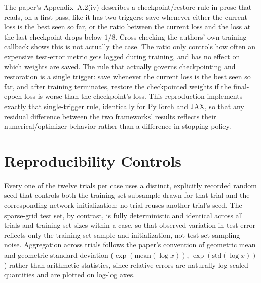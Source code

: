 The paper's Appendix~A.2(iv) describes a checkpoint/restore rule in prose
that reads, on a first pass, like it has two triggers: save whenever
either the current loss is the best seen so far, or the ratio between the
current loss and the loss at the last checkpoint drops below $1/8$.
Cross-checking the authors' own training callback shows this is not
actually the case. The ratio only controls how often an expensive
test-error metric gets logged during training, and has no effect on which
weights are saved. The rule that actually governs checkpointing and
restoration is a single trigger: save whenever the current loss is the
best seen so far, and after training terminates, restore the checkpointed
weights if the final-epoch loss is worse than the checkpoint's loss. This
reproduction implements exactly that single-trigger rule, identically for
PyTorch and JAX, so that any residual difference between the two
frameworks' results reflects their numerical/optimizer behavior rather
than a difference in stopping policy.

\section{Reproducibility Controls}

Every one of the twelve trials per case uses a distinct, explicitly
recorded random seed that controls both the training-set subsample drawn
for that trial and the corresponding network initialization; no trial
reuses another trial's seed. The sparse-grid test set, by contrast, is
fully deterministic and identical across all trials and training-set
sizes within a case, so that observed variation in test error reflects
only the training-set sample and initialization, not test-set sampling
noise. Aggregation across trials follows the paper's convention of
geometric mean and geometric standard deviation
($\exp(\mathrm{mean}(\log x))$, $\exp(\mathrm{std}(\log x))$) rather than
arithmetic statistics, since relative errors are naturally log-scaled
quantities and are plotted on log-log axes.
